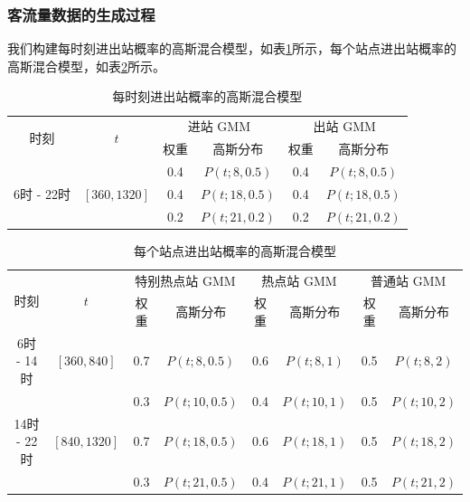 \documentclass[12pt,a4paper]{mcmthesis}
\begin{document}
    \subsubsection{客流量数据的生成过程}

    我们构建每时刻进出站概率的高斯混合模型，如表\ref{tab:p1_gmm-time}所示，每个站点进出站概率的高斯混合模型，如表\ref{tab:p1_gmm-station}所示。

    \begin{table}[h]
        \centering
        \caption{每时刻进出站概率的高斯混合模型}
        \label{tab:p1_gmm-time}
        \begin{tabular}{c|c|cc|cc}
            \hline
            \multirow{2}{*}{时刻} & \multirow{2}{*}{$t$} & \multicolumn{2}{c|}{进站 GMM} & \multicolumn{2}{c}{出站 GMM} \\ \cline{3-6}
            &                         & 权重  & 高斯分布          & 权重  & 高斯分布          \\ \hline
            &                         & 0.4 & $P(t;8,0.5)$  & 0.4 & $P(t;8,0.5)$  \\
            6时 - 22时 & $\left[360,1320\right]$ & 0.4 & $P(t;18,0.5)$ & 0.4 & $P(t;18,0.5)$ \\
            &                         & 0.2 & $P(t;21,0.2)$ & 0.2 & $P(t;21,0.2)$ \\ \hline
        \end{tabular}
    \end{table}

    \begin{table}[h]
        \centering
        \caption{每个站点进出站概率的高斯混合模型}
        \label{tab:p1_gmm-station}
        \begin{tabular}{c|c|cc|cc|cc}
            \hline
            \multirow{2}{*}{时刻} & \multirow{2}{*}{$t$} & \multicolumn{2}{c|}{特别热点站 GMM} & \multicolumn{2}{c}{热点站 GMM}
            & \multicolumn{2}{c}{普通站 GMM}
            \\ \cline{3-6}
            &                         & 权重  & 高斯分布          & 权重  & 高斯分布        & 权重  & 高斯分布        \\ \hline
            6时 - 14时  & $\left[360,840\right]$  & 0.7 & $P(t;8,0.5)$  & 0.6 & $P(t;8,1)$  & 0.5 & $P(t;8,2)$  \\
            &                         & 0.3 & $P(t;10,0.5)$ & 0.4 & $P(t;10,1)$ & 0.5 & $P(t;10,2)$ \\
            14时 - 22时 & $\left[840,1320\right]$ & 0.7 & $P(t;18,0.5)$ & 0.6 & $P(t;18,1)$ & 0.5 & $P(t;18,2)$ \\
            &                         & 0.3 & $P(t;21,0.5)$ & 0.4 & $P(t;21,1)$ & 0.5 & $P(t;21,2)$ \\ \hline
        \end{tabular}
    \end{table}
\end{document}
